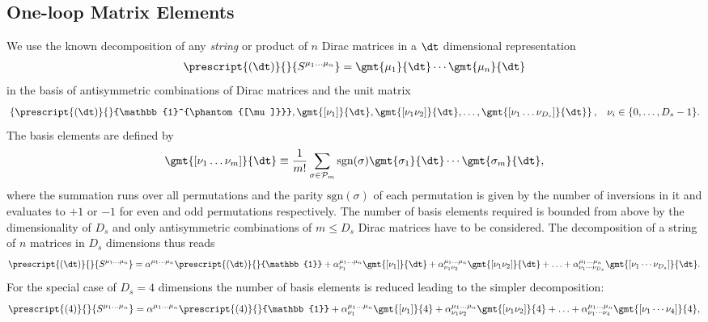 \subsection{One-loop Matrix Elements}
\label{sec:olmetrace}
We use the known decomposition of any \textit{string} or product of $n$ Dirac
matrices in a $\dt$ dimensional representation
\begin{align}
  \prescript{(\dt)}{}{S^{\mu_1\ldots \mu_n}} = \gmt{\mu_1}{\dt}\cdots \gmt{\mu_n}{\dt}
\end{align}
 in the basis of antisymmetric combinations of Dirac
matrices and the unit matrix 
\begin{align}
  &\left\{
    \prescript{(\dt)}{}{\mathbb{1}^{\phantom{[\mu]}}},\gmt{[\nu_1]}{\dt},\gmt{[\nu_1\nu_2]}{\dt},\ldots,
    \gmt{[\nu_1\ldots\nu_{D_s}]}{\dt}\right\},& \nu_i \in \{0,\ldots,D_s-1\}.
\end{align}
 The basis elements are defined by
\begin{align}
  \gmt{[\nu_1\ldots\nu_m]}{\dt}\equiv \frac{1}{m!}\sum_{\sigma \in
    \mathcal{P}_m} \text{sgn}(\sigma) \gmt{\sigma_1}{\dt}\cdots \gmt{\sigma_m}{\dt},
\end{align}
where the summation runs over all permutations and the parity
$\text{sgn}(\sigma)$ of each
permutation is given by the number of inversions in it and evaluates to $+1$ or $-1$ for
even and odd permutations respectively. The number of basis elements
required is bounded from above by the dimensionality of $D_s$ and only
antisymmetric combinations of $m\leq D_s$ Dirac matrices have to be considered. The decomposition of a string of $n$ matrices in
$D_s$ dimensions thus reads
\begin{align}
  \prescript{(\dt)}{}{S^{\mu_1\ldots \mu_n}} = \alpha^{\mu_1\ldots \mu_n} \prescript{(\dt)}{}{\mathbb{1}} +
  \alpha_{\nu_1}^{\mu_1\ldots \mu_n} \gmt{[\nu_1]}{\dt} +
  \alpha_{\nu_1\nu_2}^{\mu_1\ldots \mu_n} \gmt{[\nu_1\nu_2]}{\dt}+\ldots+\alpha_{\nu_1\cdots\nu_{D_s}}^{\mu_1\ldots \mu_n} \gmt{[\nu_1\cdots\nu_{D_s}]}{\dt}.
\end{align}
For the special case of $D_s=4$ dimensions the number of basis
elements is reduced leading to the simpler decomposition:
\begin{align}
  \prescript{(4)}{}{S^{\mu_1\ldots \mu_n}} = \alpha^{\mu_1\ldots \mu_n} \prescript{(4)}{}{\mathbb{1}} +
  \alpha_{\nu_1}^{\mu_1\ldots \mu_n} \gmt{[\nu_1]}{4} +
  \alpha_{\nu_1\nu_2}^{\mu_1\ldots \mu_n} \gmt{[\nu_1\nu_2]}{4}+\ldots+\alpha_{\nu_1\cdots\nu_{4}}^{\mu_1\ldots \mu_n} \gmt{[\nu_1\cdots\nu_{4}]}{4},
\end{align}
